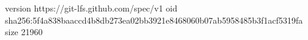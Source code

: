 version https://git-lfs.github.com/spec/v1
oid sha256:5f4a838baaccd4b8db273ea02bb3921e8468060b07ab5958485b3f1acf5319fa
size 21960
